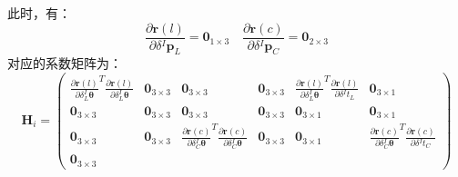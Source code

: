 此时，有：
\begin{equation}
  \frac{\partial \boldsymbol{r}(l)}{\partial \delta {^{I}\boldsymbol{p}_L}}=\boldsymbol{0}_{1\times 3}
  \quad
  \frac{\partial \boldsymbol{r}(c)}{\partial \delta {^{I}\boldsymbol{p}_C}}=\boldsymbol{0}_{2\times 3}
\end{equation}
对应的系数矩阵为：
\begin{equation}
  \boldsymbol{H}_i=\begin{pmatrix}
    \frac{\partial \boldsymbol{r}(l)}{\partial \delta {^{I}_{L}\boldsymbol{\theta}}}^T
    \frac{\partial \boldsymbol{r}(l)}{\partial \delta {^{I}_{L}\boldsymbol{\theta}}} &
    \boldsymbol{0}_{3\times 3}                                                       &
    \boldsymbol{0}_{3\times 3}                                                       &
    \boldsymbol{0}_{3\times 3}                                                       &
    \frac{\partial \boldsymbol{r}(l)}{\partial \delta {^{I}_{L}\boldsymbol{\theta}}}^T
    \frac{\partial \boldsymbol{r}(l)}{\partial \delta {^{I}t_{L}}}                   &
    \boldsymbol{0}_{3\times 1}                                                         \\
    \boldsymbol{0}_{3\times 3}                                                       &
    \boldsymbol{0}_{3\times 3}                                                       &
    \boldsymbol{0}_{3\times 3}                                                       &
    \boldsymbol{0}_{3\times 3}                                                       &
    \boldsymbol{0}_{3\times 1}                                                       &
    \boldsymbol{0}_{3\times 1}                                                         \\
    \boldsymbol{0}_{3\times 3}                                                       &
    \boldsymbol{0}_{3\times 3}                                                       &
    \frac{\partial \boldsymbol{r}(c)}{\partial \delta {^{I}_{C}\boldsymbol{\theta}}}^T
    \frac{\partial \boldsymbol{r}(c)}{\partial \delta {^{I}_{C}\boldsymbol{\theta}}} &
    \boldsymbol{0}_{3\times 3}                                                       &
    \boldsymbol{0}_{3\times 1}                                                       &
    \frac{\partial \boldsymbol{r}(c)}{\partial \delta {^{I}_{C}\boldsymbol{\theta}}}^T
    \frac{\partial \boldsymbol{r}(c)}{\partial \delta {^{I}t_{C}}}                     \\
    \boldsymbol{0}_{3\times 3}                                                       &

\end{pmatrix}
\end{equation}
